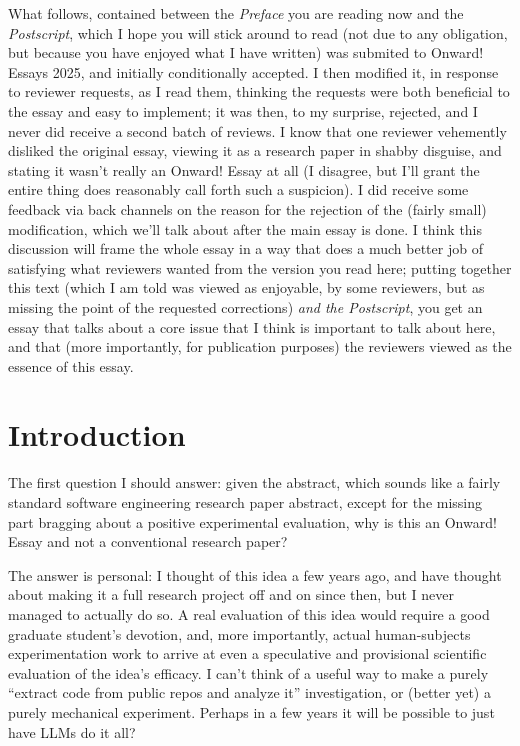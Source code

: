 \documentclass[sigplan,screen]{acmart}
\begin{document}
What follows, contained between the \emph{Preface} you are reading now
and the \emph{Postscript}, which I hope you will stick around to read
(not due to any obligation, but because you have enjoyed what I have
written) was submited to Onward! Essays 2025, and initially
conditionally accepted.  I then modified it, in response to reviewer
requests, as I read them, thinking the requests were both beneficial
to the essay and easy to implement; it was then, to my surprise, rejected, and I
never did receive a second batch of reviews.  I know that one reviewer
vehemently disliked the original essay, viewing it as a research paper
in shabby disguise, and stating it wasn't really an Onward! Essay at
all (I disagree, but I'll grant the entire thing does reasonably call
forth such a suspicion).  I did receive some feedback via back
channels on the reason
for the rejection of the (fairly small) modification, which we'll talk
about after the main essay is done.  I think this discussion will
frame the whole essay in a way that does a much better job of
satisfying what reviewers wanted from the version you read here; putting
together this text (which I am told was viewed as enjoyable, by some
reviewers, but as missing the point of the requested corrections)
\emph{and the Postscript}, you get an essay that talks about a core issue that I think is
important to talk about here, and that (more importantly, for
publication purposes) the reviewers viewed as the essence of this essay.

\section{Introduction}

The first question I should answer: given the abstract, which sounds
like a fairly standard software engineering research paper abstract,
except for the missing part bragging
about a positive experimental evaluation, why is this an Onward! Essay
and not a conventional research paper?

The answer is personal:  I thought of this idea a few years ago, and
have thought about making it a full research project off and on since
then, but I
never managed to actually do so.  A real evaluation of this idea would
require a good graduate student's devotion, and, more importantly,
actual human-subjects experimentation work to arrive at even a
speculative and provisional scientific evaluation of the idea's
efficacy.  I can't think of a useful way to make a purely ``extract
code from public repos and analyze it'' investigation, or (better yet)
a purely mechanical experiment.  Perhaps in a few years it will be
possible to just have LLMs do it all?
\end{document}
